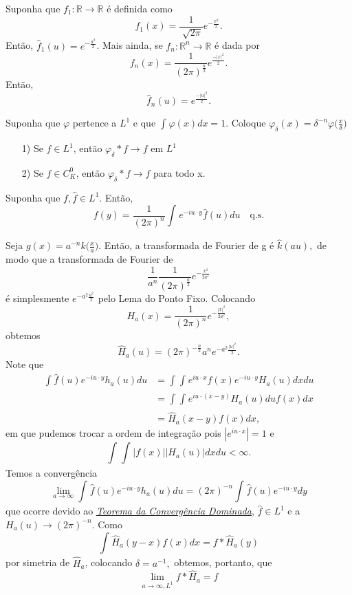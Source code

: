 \documentclass[measure_theory.tex]{subfiles}
\begin{document}
\begin{lemma*}
	Suponha que \(f_1:\mathbb{R}\rightarrow \mathbb{R}\) é definida como
	\[
		f_1(x) = \frac{1}{\sqrt[]{2\pi }}e^{-\frac{x^{2}}{2}}.
	\]
	Então, \(\hat{f}_{1}(u) = e^{-\frac{u^{2}}{2}}\).
	Mais ainda, se \(f_{n}:\mathbb{R}^{n}\rightarrow \mathbb{R}\) é dada por
	\[
		f_{n}(x) = \frac{1}{(2\pi )^{\frac{n}{2}}}e^{\frac{-|x|^{2}}{2}}.
	\]
	Então,
	\[
		\hat{f}_{n}(u) = e^{\frac{-|u|^{2}}{2}}.
	\]
\end{lemma*}
\begin{lemma*}
	Suponha que \(\varphi \) pertence a \(L^{1}\) e que \(\int_{}^{}\varphi (x)dx = 1\). Coloque \(\varphi_{\delta }(x) = \delta ^{-n}\varphi \biggl(\frac{x}{\delta }\biggr)\)
	\begin{itemize}
		\item[1)] Se \(f\in L^{1}\), então \(\varphi_\delta * f\to f\) em \(L^{1}\)
		\item[2)] Se \(f\in C_{K}^{0}\), então \(\varphi_{\delta }*f\to f\) para todo x.
	\end{itemize}
\end{lemma*}
\hypertarget{inversion}{
	\begin{theorem*}
		Suponha que \(f, \hat{f}\in L^{1}.\) Então,
		\[
			f(y) = \frac{1}{(2\pi )^{n}}\int_{}^{}e^{-iu \cdot y}\hat{f}(u)du \quad \text{q.s.}
		\]
	\end{theorem*}}
\begin{proof*}
	Seja \(g(x) = a^{-n}k \biggl(\frac{x}{a}\biggr).\) Então, a transformada de Fourier de g é \(\hat{k}(au),\) de modo que a transformada de Fourier de
	\[
		\frac{1}{a^{n}}\frac{1}{(2\pi )^{\frac{n}{2}}}e^{-\frac{x^{2}}{2a^{2}}}
	\]
	é simplesmente \(e^{-a^{2}\frac{u^{2}}{2}}\) pelo Lema do Ponto Fixo. Colocando
	\[
		H_{a}(x) = \frac{1}{(2\pi )^{n}}e^{-\frac{|x|^{2}}{2a^{2}}},
	\]
	obtemos
	\[
		\hat{H}_{a}(u) = (2\pi )^{-\frac{n}{2}}a^{n}e^{-a^{2}\frac{|u|^{2}}{2}}.
	\]
	Note que
	\begin{align*}
		\int_{}^{}\hat{f}(u)e^{-iu \cdot y}h_{a}(u)du & = \int_{}^{}\int_{}^{}e^{iu \cdot x}f(x)e^{-iu \cdot y}H_{a}(u)dxdu \\
		                                              & = \int_{}^{}\int_{}^{}e^{iu \cdot (x-y)}H_{a}(u)duf(x)dx            \\
		                                              & = \hat{H}_{a}(x-y)f(x)dx,
	\end{align*}
	em que pudemos trocar a ordem de integração pois \(|e^{iu \cdot x}| = 1\) e
	\[
		\int_{}^{}\int_{}^{}|f(x)||H_a(u)|dxdu < \infty.
	\]
	Temos a convergência
	\[
		\lim_{a\to \infty}\int_{}^{}\hat{f}(u)e^{-iu \cdot y}h_{a}(u)du =(2\pi )^{-n}\int_{}^{}\hat{f}(u)e^{-iu \cdot y}dy
	\]
	que ocorre devido ao \hyperlink{dominated_convergence}{\textit{Teorema da Convergência Dominada}}, \(\hat{f}\in L^{1}\) e a \(H_{a}(u)\to (2\pi )^{-n}\). Como
	\[
		\int_{}^{}\hat{H}_{a}(y-x)f(x)dx = f*\hat{H}_{a}(y)
	\]
	por simetria de \(\hat{H}_{a}\), colocando \(\delta  = a^{-1},\) obtemos, portanto, que
	\[
		\lim_{a\to \infty, L^{1}}f*\hat{H}_{a} = f
	\]
\end{proof*}
\end{document}
